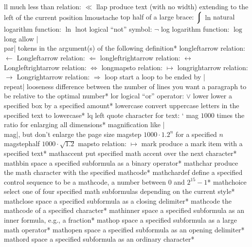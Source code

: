 \capcs ll {much less than relation: $\ll$}{}{}
\capcs llap {produce text (with no width) extending to the left
   of the current position}{}{}
\capcs lmoustache {top half of a large brace: $\big\lmoustache$}{}{}
\capcs ln {natural logarithm function: $\ln$}{}{}
\capcs lnot {logical ``not'' symbol: $\lnot$}{}{}
\capcs log {logarithm function: $\log$}{}{}
\capcs long {allow |\\par| tokens in the argument(s) of
   the following definition}*{}
\capcs longleftarrow {relation: $\longleftarrow$}{}{}
\capcs Longleftarrow {relation: $\Longleftarrow$}{}{}
\capcs longleftrightarrow {relation: $\longleftrightarrow$}{}{}
\capcs Longleftrightarrow {relation: $\Longleftrightarrow$}{}{}
\capcs longmapsto {relation: $\longmapsto$}{}{}
\capcs longrightarrow {relation: $\longrightarrow$}{}{}
\capcs Longrightarrow {relation: $\Longrightarrow$}{}{}
\capcs loop {start a loop to be ended by |\\repeat|}{}{}
\capcs looseness {difference between the number of lines you want a
   paragraph to be relative to the optimal number}*{}
\capcs lor {logical ``or'' operator: $\lor$}{}{}
\capcs lower {lower a specified box by a specified amount}*{}
\capcs lowercase {convert uppercase letters in the specified text
   to lowercase}*{}
\capcs lq {left quote character for text: \lq}{}{}
\capcs mag {$1000$ times the ratio for enlarging all dimensions}*{}
\capcs magnification {like |\\mag|, but don't enlarge the page size}{}{}
\capcs magstep {$1000 \cdot 1.2^n$ for a specified $n$}{}{}
\capcs magstephalf {$1000\cdot\sqrt{1.2}$}{}{}
\capcs mapsto {relation: $\mapsto$}{}{}
\capcs mark {produce a mark item with a specified text}*{}
\capcs mathaccent {put specified math accent over the next character}*{}
\capcs mathbin {space a specified subformula as a binary operator}*{}
\capcs mathchar {produce the math character with the specified mathcode}*{}
\capcs mathchardef {define a specified control sequence to be a mathcode,
   a number between 0 and $2^{15}-1$}*{}
\capcs mathchoice {select one of four specified math subformulas
   depending on the current style}*{}
\capcs mathclose {space a specified subformula as a closing delimiter}*{}
\capcs mathcode {the mathcode of a specified character}*{}
\capcs mathinner {space a specified subformula as an inner formula, e.g., a
   fraction}*{}
\capcs mathop {space a specified subformula as a large math operator}*{}
\capcs mathopen {space a specified subformula as an opening delimiter}*{}
\capcs mathord {space a specified subformula as an ordinary character}*{}
